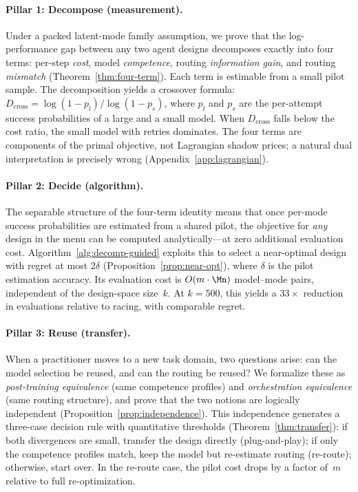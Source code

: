 \paragraph{Pillar 1: Decompose (measurement).}
Under a packed latent-mode family assumption, we prove that the
log-performance gap between any two agent designs decomposes exactly into
four terms: per-step \emph{cost}, model \emph{competence}, routing
\emph{information gain}, and routing \emph{mismatch}
(Theorem~\ref{thm:four-term}).  Each term is estimable from a small pilot
sample.  The decomposition yields a crossover formula:
$D_{\mathrm{cross}} = \log(1-p_l)/\log(1-p_s)$, where $p_l$ and $p_s$ are
the per-attempt success probabilities of a large and a small model.  When
$D_{\mathrm{cross}}$ falls below the cost ratio, the small model with
retries dominates.  The four terms are components of the primal objective,
not Lagrangian shadow prices; a natural dual interpretation is precisely
wrong (Appendix~\ref{app:lagrangian}).

\paragraph{Pillar 2: Decide (algorithm).}
The separable structure of the four-term identity means that once per-mode
success probabilities are estimated from a shared pilot, the objective for
\emph{any} design in the menu can be computed analytically---at zero
additional evaluation cost.
Algorithm~\ref{alg:decomp-guided} exploits this to select a near-optimal
design with regret at most $2\delta$ (Proposition~\ref{prop:near-opt}),
where $\delta$ is the pilot estimation accuracy.
Its evaluation cost is $O(m \cdot \Mn)$ model--mode pairs, independent of
the design-space size~$k$.
At $k{=}500$, this yields a $33\times$ reduction in evaluations relative to
racing, with comparable regret.

\paragraph{Pillar 3: Reuse (transfer).}
When a practitioner moves to a new task domain, two questions arise: can the
model selection be reused, and can the routing be reused?  We formalize
these as \emph{post-training equivalence} (same competence profiles) and
\emph{orchestration equivalence} (same routing structure), and prove that
the two notions are logically independent
(Proposition~\ref{prop:independence}).
This independence generates a three-case decision rule with quantitative
thresholds (Theorem~\ref{thm:transfer}): if both divergences are small,
transfer the design directly (plug-and-play); if only the competence
profiles match, keep the model but re-estimate routing (re-route);
otherwise, start over.  In the re-route case, the pilot cost drops by a
factor of~$m$ relative to full re-optimization.

